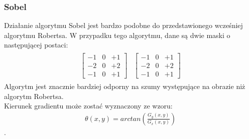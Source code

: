 \subsubsection{Sobel} \label{sssec:sobel}
Działanie algorytmu Sobel jest bardzo podobne do przedstawionego wcześniej algorytmu Robertsa. W przypadku tego algorytmu, dane są dwie maski o następującej postaci:
\begin{gather*}
\begin{matrix}
  \begin{bmatrix}
    -1 & 0 & +1 \\
    -2 & 0 & +2 \\
    -1 & 0 & +1
  \end{bmatrix}
&
  \begin{bmatrix}
    -1 & 0 & +1 \\
    -2 & 0 & +2 \\
    -1 & 0 & +1
  \end{bmatrix}
\end{matrix}
\end{gather*}
Algorytm jest znacznie bardziej odporny na szumy występujące na obrazie niż algorytm Robertsa. \\
Kierunek gradientu może zostać wyznaczony ze wzoru:
\begin{gather*}
  \theta(x, y) = arctan(\frac{G_y(x, y)}{G_x(x, y)})
\end{gather*}.
